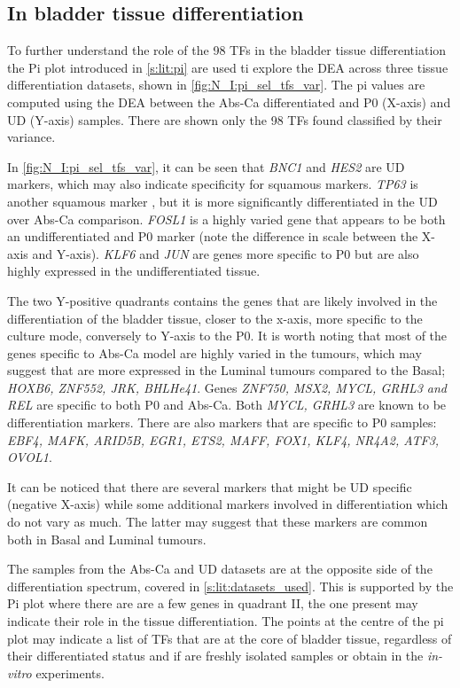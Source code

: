 \subsection{In bladder tissue differentiation} \label{s:N:sel_tf_diff_status}


To further understand the role of the 98 TFs in the bladder tissue differentiation the Pi plot introduced in \cref{s:lit:pi} are used ti explore the \gls{DEA} across three tissue differentiation datasets, shown in \cref{fig:N_I:pi_sel_tfs_var}. The pi values are computed using the DEA between the Abs-Ca differentiated and P0 (X-axis) and UD (Y-axis) samples. There are shown only the 98 TFs found classified by their variance.

In \cref{fig:N_I:pi_sel_tfs_var}, it can be seen that \textit{BNC1} and \textit{HES2} are UD markers, which may also indicate specificity for squamous markers. \textit{TP63} is another squamous marker \citep{Robertson2017-mg}, but it is more significantly differentiated in the UD over Abs-Ca comparison. \textit{FOSL1} is a highly varied gene that appears to be both an undifferentiated and P0 marker (note the difference in scale between the X-axis and Y-axis). \textit{KLF6} and \textit{JUN} are genes more specific to P0 but are also highly expressed in the undifferentiated tissue.

The two Y-positive quadrants contains the genes that are likely involved in the differentiation of the bladder tissue, closer to the x-axis, more specific to the culture mode, conversely to Y-axis to the P0. It is worth noting that most of the genes specific to Abs-Ca model are highly varied in the tumours, which may suggest that are more expressed in the Luminal tumours compared to the Basal; \textit{HOXB6, ZNF552, JRK, BHLHe41}. Genes \textit{ZNF750, MSX2, MYCL, GRHL3 and REL} are specific to both P0 and Abs-Ca. Both \textit{MYCL, GRHL3} are known to be differentiation markers. There are also markers that are specific to P0 samples: \textit{EBF4, MAFK, ARID5B, EGR1, ETS2, MAFF, FOX1, KLF4, NR4A2, ATF3, OVOL1}. 

It can be noticed that there are several markers that might be UD specific (negative X-axis) while some additional markers involved in differentiation which do not vary as much. The latter may suggest that these markers are common both in Basal and Luminal tumours. 

The samples from the Abs-Ca and UD datasets are at the opposite side of the differentiation spectrum, covered in \cref{s:lit:datasets_used}. This is supported by the Pi plot where there are are a few genes in quadrant II, the one present may indicate their role in the tissue differentiation. The points at the centre of the pi plot may indicate a list of TFs that are at the core of bladder tissue, regardless of their differentiated status and if are freshly isolated samples or obtain in the \textit{in-vitro} experiments.


